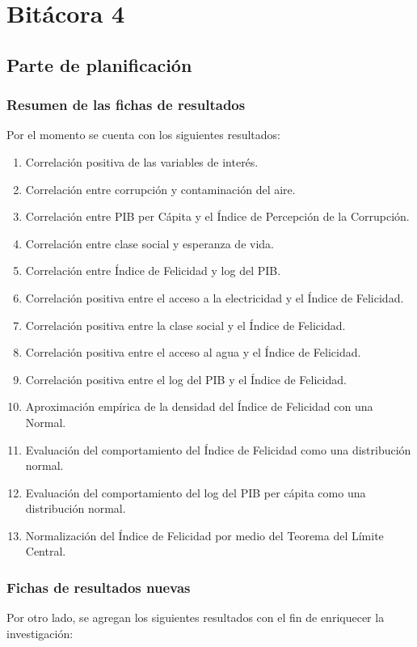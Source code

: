 \chapter{Bitácora 4} \label{bitacora4}

\section{Parte de planificación}



\subsection{Resumen de las fichas de resultados}
Por el momento se cuenta con los siguientes resultados:

\begin{enumerate}
    \item Correlación positiva de las variables de interés.
    \item Correlación entre corrupción y contaminación del aire.
    \item Correlación entre PIB per Cápita y el Índice de Percepción de la Corrupción.
    \item Correlación entre clase social y esperanza de vida.
    \item Correlación entre Índice de Felicidad y log del PIB.
    \item Correlación positiva entre el acceso a la electricidad y el Índice de Felicidad.
    \item Correlación positiva entre la clase social y el Índice de Felicidad.
    \item Correlación positiva entre el acceso al agua y el Índice de Felicidad.
    \item Correlación positiva entre el log del PIB y el Índice de Felicidad.
    \item Aproximación empírica de la densidad del Índice de Felicidad con una Normal.
    \item Evaluación del comportamiento del Índice de Felicidad como una distribución normal.
    \item Evaluación del comportamiento del log del PIB per cápita como una distribución normal.
    \item Normalización del Índice de Felicidad por medio del Teorema del Límite Central.
\end{enumerate}

\subsection{Fichas de resultados nuevas}
Por otro lado, se agregan los siguientes resultados con el fin de enriquecer la investigación:

